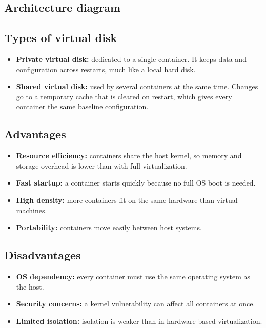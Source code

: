 \documentclass[11pt,a4paper]{article}
\begin{document}
\subsection{Architecture diagram}

\subsection{Types of virtual disk}

\begin{itemize}\itemsep3pt
  \item \textbf{Private virtual disk:} dedicated to a single container. It keeps data and
        configuration across restarts, much like a local hard disk.
  \item \textbf{Shared virtual disk:} used by several containers at the same time. Changes go
        to a temporary cache that is cleared on restart, which gives every container the same
        baseline configuration.
\end{itemize}

\subsection{Advantages}

\begin{itemize}\itemsep3pt
  \item \textbf{Resource efficiency:} containers share the host kernel, so memory and storage
        overhead is lower than with full virtualization.
  \item \textbf{Fast startup:} a container starts quickly because no full OS boot is needed.
  \item \textbf{High density:} more containers fit on the same hardware than virtual machines.
  \item \textbf{Portability:} containers move easily between host systems.
\end{itemize}

\subsection{Disadvantages}

\begin{itemize}\itemsep3pt
  \item \textbf{OS dependency:} every container must use the same operating system as the host.
  \item \textbf{Security concerns:} a kernel vulnerability can affect all containers at once.
  \item \textbf{Limited isolation:} isolation is weaker than in hardware-based virtualization.
\end{itemize}
\end{document}
